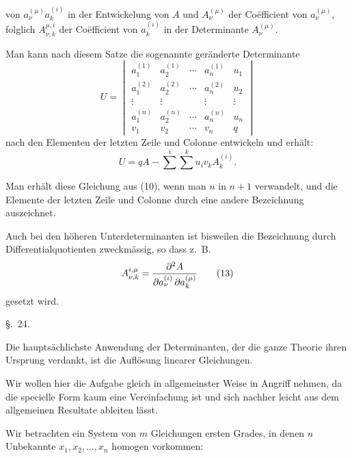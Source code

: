 
von \(a_\nu^{(\mu)}a_k^{(i)}\) in der Entwickelung von \(A\) und \(A_\nu^{(\mu)}\) der Coëfficient von \(a_\nu^{(\mu)}\), folglich \(A_{\nu,k}^{\mu,i}\) der Coëfficient von \(a_k^{(i)}\) in der Determinante \(A_\nu^{(\mu)}\).

Man kann nach diesem Satze die sogenannte geränderte Determinante
\begin{equation}
        U=\begin{vmatrix}
        a_1^{(1)}&a_2^{(1)}&\cdots&a_n^{(1)}&u_1\\
        a_1^{(2)}&a_2^{(2)}&\cdots&a_n^{(2)}&u_2\\
        \vdots&\vdots&&\vdots&\vdots\\
        a_1^{(n)}&a_2^{(n)}&\cdots&a_n^{(n)}&u_n\\
        v_1&v_2&\cdots&v_n&q
        \end{vmatrix}
\tag{11}
\end{equation}
nach den Elementen der letzten Zeile und Colonne entwickeln und erhält:
\begin{equation}
        U=qA-\sum^{i}\sum^{k} u_i v_k A_k^{(i)}.
\tag{12}
\end{equation}

Man erhält diese Gleichung aus (10), wenn man \(n\) in \(n+1\) verwandelt, und die Elemente der letzten Zeile und Colonne durch eine andere Bezeichnung auszeichnet.

Auch bei den höheren Unterdeterminanten ist bisweilen die Bezeichnung durch Differentialquotienten zweckmässig, so dass z.~B.
\begin{equation}
        A_{\nu,k}^{i,\mu}=
        {\partial^2 A\over \partial a_\nu^{(i)}\,\partial a_k^{(\mu)}}
\tag{13}
\end{equation}
gesetzt wird.




\begin{center}
{\large \S.\ 24.}

\vspace{0.5em}
{\large{}}
\end{center}

Die hauptsächlichste Anwendung der Determinanten, der die ganze Theorie ihren Ursprung verdankt, ist die Auflösung linearer Gleichungen.

Wir wollen hier die Aufgabe gleich in allgemeinster Weise in Angriff nehmen, da die specielle Form kaum eine Vereinfachung ist und sich nachher leicht aus dem allgemeinen Resultate ableiten lässt.

Wir betrachten ein System von $m$ Gleichungen ersten Grades, in denen $n$ Unbekannte $x_1,x_2,\ldots,x_n$ homogen vorkommen:
